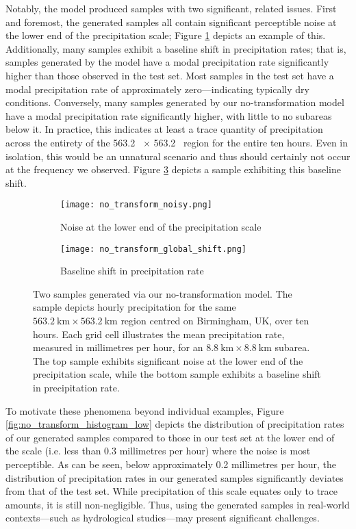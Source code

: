 \documentclass[ oneside,%
                    author={George Herbert},
                    degree={MSci},
                     title={Video Diffusion Models for Climate Simulations},
                  subtitle={}]{dissertation}
\begin{document}
Notably, the model produced samples with two significant, related issues. First and foremost, the generated samples all contain significant perceptible noise at the lower end of the precipitation scale; Figure \ref{fig:no_transform_sample} depicts an example of this. Additionally, many samples exhibit a baseline shift in precipitation rates; that is, samples generated by the model have a modal precipitation rate significantly higher than those observed in the test set. Most samples in the test set have a modal precipitation rate of approximately zero---indicating typically dry conditions. Conversely, many samples generated by our no-transformation model have a modal precipitation rate significantly higher, with little to no subareas below it. In practice, this indicates at least a trace quantity of precipitation across the entirety of the 563.2\  $\times$ 563.2\  region for the entire ten hours. Even in isolation, this would be an unnatural scenario and thus should certainly not occur at the frequency we observed. Figure \ref{fig:no_transform_global_shift} depicts a sample exhibiting this baseline shift.

\begin{figure}[htbp]
      \centering
      \begin{subfigure}{\textwidth}
            \texttt{[image: no\_transform\_noisy.png]}
            \caption{Noise at the lower end of the precipitation scale}
            \label{fig:no_transform_sample}
      \end{subfigure}
      \begin{subfigure}{\textwidth}
            \texttt{[image: no\_transform\_global\_shift.png]}
            \caption{Baseline shift in precipitation rate}
            \label{fig:no_transform_global_shift}
      \end{subfigure}
      \caption{Two samples generated via our no-transformation model. The sample depicts hourly precipitation for the same $563.2\ \mathrm{km} \times 563.2\ \mathrm{km}$ region centred on Birmingham, UK, over ten hours. Each grid cell illustrates the mean precipitation rate, measured in millimetres per hour, for an $8.8 \ \mathrm{km} \times 8.8\ \mathrm{km}$ subarea. The top sample exhibits significant noise at the lower end of the precipitation scale, while the bottom sample exhibits a baseline shift in precipitation rate.}
\end{figure}

To motivate these phenomena beyond individual examples, Figure \ref{fig:no_transform_histogram_low} depicts the distribution of precipitation rates of our generated samples compared to those in our test set at the lower end of the scale (i.e. less than 0.3 millimetres per hour) where the noise is most perceptible. As can be seen, below approximately 0.2 millimetres per hour, the distribution of precipitation rates in our generated samples significantly deviates from that of the test set. While precipitation of this scale equates only to trace amounts, it is still non-negligible. Thus, using the generated samples in real-world contexts---such as hydrological studies---may present significant challenges.
\end{document}
